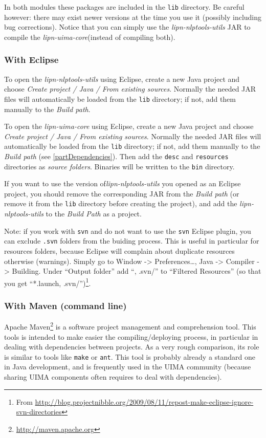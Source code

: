 \documentclass{article}
\newcommand{\uimaModule}{{\em lipn-uima-core}\xspace}
\newcommand{\utilsModule}{{\em lipn-nlptools-utils}\xspace}
\begin{document}
In both modules these packages are included in the {\tt lib} directory. Be careful however: there may exist newer versions at the time you use it (possibly including bug corrections). Notice that you can simply use the \utilsModule JAR to compile the \uimaModule (instead of compiling both).




\subsubsection{With Eclipse}
\label{partCompileEclipse}

To open the \utilsModule using Eclipse, create a new Java project and choose {\em Create project / Java / From existing sources}. Normally the needed JAR files will automatically be loaded from the {\tt lib} directory; if not, add  them manually to the {\em Build path}.

To open the \uimaModule using Eclipse,  create a new Java project and choose {\em Create project / Java / From existing sources}. Normally the needed JAR files will automatically be loaded from the {\tt lib} directory; if not, add  them manually to the {\em Build path} (see \ref{partDependencies}). Then add the {\tt desc} and {\tt resources} directories as {\em source folders}. Binaries will be written to the {\tt bin} directory.

If you want to use the version of\utilsModule  you opened as an Eclipse project, you should remove the corresponding JAR from the {\em Build path} (or remove it from the {\tt lib} directory before creating the project), and add the \utilsModule to the {\em Build Path} as a project. 

Note: if you work with {\tt svn} and do not want to use the {\tt svn} Eclipse plugin, you can exclude {\tt .svn} folders from the buiding process. This is useful in particular for resources folders, because Eclipse will complain about duplicate resources otherwise (warnings). Simply go to Window -> Preferences…, Java -> Compiler -> Building. Under “Output folder” add “, .svn/” to “Filtered Resources” (so that you get “*.launch, .svn/”)\footnote{From \url{http://blog.projectnibble.org/2009/08/11/repost-make-eclipse-ignore-svn-directories}}.

\subsubsection{With Maven (command line)}

\label{partMaven}
Apache Maven\footnote{\url{http://maven.apache.org}} is a software project management and comprehension tool. This tools is intended to make easier the compiling/deploying process, in particular in dealing with dependencies between projects. As a very rough comparison, its role is similar to tools like {\tt make} or {\tt ant}. This tool is probably already  a standard one in Java development, and is frequently used in the UIMA community (because sharing UIMA components often requires to deal with dependencies). 
\end{document}
